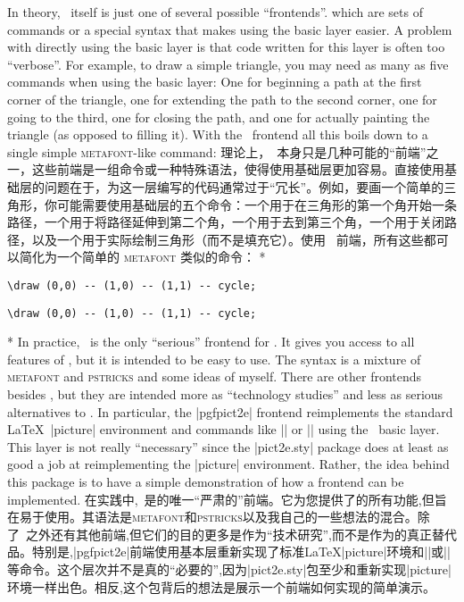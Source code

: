 \begin{paracol}{2}
In theory, \tikzname\ itself is just one of several possible ``frontends''.
which are sets of commands or a special syntax that makes using the basic layer
easier. A problem with directly using the basic layer is that code written for
this layer is often too ``verbose''. For example, to draw a simple triangle,
you may need as many as five commands when using the basic layer: One for
beginning a path at the first corner of the triangle, one for extending the
path to the second corner, one for going to the third, one for closing the
path, and one for actually painting the triangle (as opposed to filling it).
With the \tikzname\ frontend all this boils down to a single simple
\textsc{metafont}-like command:
\switchcolumn
理论上，\tikzname\ 本身只是几种可能的“前端”之一，这些前端是一组命令或一种特殊语法，使得使用基础层更加容易。直接使用基础层的问题在于，为这一层编写的代码通常过于“冗长”。例如，要画一个简单的三角形，你可能需要使用基础层的五个命令：一个用于在三角形的第一个角开始一条路径，一个用于将路径延伸到第二个角，一个用于去到第三个角，一个用于关闭路径，以及一个用于实际绘制三角形（而不是填充它）。使用 \tikzname\ 前端，所有这些都可以简化为一个简单的 \textsc{metafont} 类似的命令：
%
\switchcolumn[0]*
\begin{verbatim}
\draw (0,0) -- (1,0) -- (1,1) -- cycle;
\end{verbatim}
\switchcolumn
\begin{verbatim}
\draw (0,0) -- (1,0) -- (1,1) -- cycle;
\end{verbatim}
\switchcolumn[0]*
In practice, \tikzname\ is the only ``serious'' frontend for \pgfname. It gives
you access to all features of \pgfname, but it is intended to be easy to use.
The syntax is a mixture of \textsc{metafont} and \textsc{pstricks} and some
ideas of myself. There are other frontends besides \tikzname, but they are intended
more as ``technology studies'' and less as serious alternatives to
\tikzname. In particular, the |pgfpict2e| frontend   reimplements the standard
\LaTeX\ |{picture}|  environment and commands like |\line| or |\vector| using
the \pgfname\ basic layer. This layer is not really ``necessary'' since the
|pict2e.sty| package does at least as good a job at reimplementing the
|{picture}| environment. Rather, the idea behind this package is to have a
simple demonstration of how a frontend can be implemented.
\switchcolumn
在实践中,\tikzname\ 是\pgfname 的唯一“严肃的”前端。它为您提供了\pgfname 的所有功能,但旨在易于使用。其语法是\textsc{metafont}和\textsc{pstricks}以及我自己的一些想法的混合。除了\tikzname\ 之外还有其他前端,但它们的目的更多是作为“技术研究”,而不是作为\tikzname 的真正替代品。特别是,|pgfpict2e|前端使用\pgfname 基本层重新实现了标准\LaTeX|{picture}|环境和|\line|或|\vector|等命令。这个层次并不是真的“必要的”,因为|pict2e.sty|包至少和重新实现|{picture}|环境一样出色。相反,这个包背后的想法是展示一个前端如何实现的简单演示。


\end{paracol}
